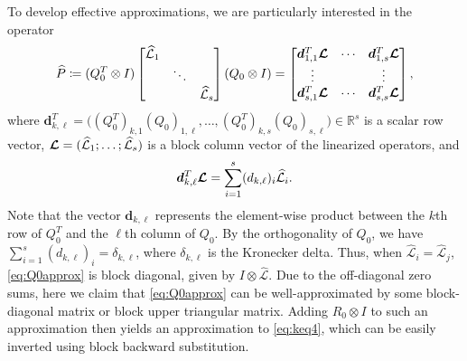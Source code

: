 \documentclass[review]{siamart}
\begin{document}

To develop effective approximations, we are particularly interested in the operator
%
\begin{align}\label{eq:Q0approx}
\widehat{P} \coloneqq (Q_0^T\otimes I) \begin{bmatrix}
	\widehat{\mathcal{L}}_1  & \\ & \ddots \\ && \widehat{\mathcal{L}}_s\end{bmatrix}
	(Q_0\otimes I)
= \begin{bmatrix}
	\bm{d}^T_{1,1} \bm{{\cal L}} & \cdots & \bm{d}^T_{1,s} \bm{{\cal L}} \\
	\vdots & & \vdots \\
	\bm{d}^T_{s,1} \bm{{\cal L}} & \cdots & \bm{d}^T_{s,s} \bm{{\cal L}}
	\end{bmatrix},
\end{align}
%
where $\bm{d}^T_{k,\ell} = \Big((Q_0^T)_{k ,1} (Q_0)_{1, \ell},
\ldots, (Q_0^T)_{k, s} (Q_0)_{s, \ell} \Big) \in \mathbb{R}^s$ is a scalar row
vector, $\bm{{\cal L}} = (\widehat{\mathcal{L}}_1; \ldots; \widehat{\mathcal{L}}_s)$
is a block column vector of the linearized operators, and
%
\begin{align*}
\bm{d}^T_{k,\ell} \bm{{\cal L}} = \sum \limits_{i = 1}^s (d_{k, \ell})_i
	\widehat{\mathcal{L}}_i.
\end{align*}
%
Note that the vector $\bm{d}_{k, \ell}$ represents the element-wise product
between the $k$th row of $Q_0^T$ and the $\ell$th column of $Q_0$. By the
orthogonality of $Q_0$, we have $\sum_{i = 1}^s (d_{k, \ell})_i =
\delta_{k,\ell}$, where $\delta_{k,\ell}$ is the Kronecker delta. Thus, when
$\widehat{\mathcal{L}}_i = \widehat{\mathcal{L}}_j$, \eqref{eq:Q0approx} is
block diagonal, given by $I\otimes\widehat{\mathcal{L}}$.
Due to the off-diagonal zero sums, here we claim that \eqref{eq:Q0approx}
can be well-approximated by some block-diagonal matrix or block upper triangular
matrix. Adding $R_0\otimes I$ to such an approximation then yields an
approximation to \eqref{eq:keq4}, which can be easily inverted using block backward
substitution.
\end{document}
